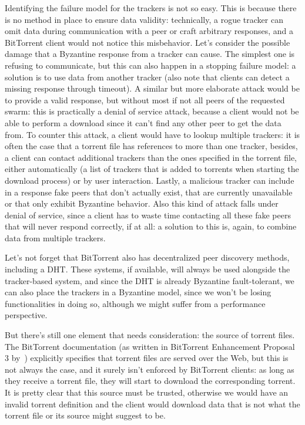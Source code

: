 \documentclass[mscthesis]{usiinfthesis}
\begin{document}
Identifying the failure model for the trackers is not so easy. This is because there is no method in place to ensure data validity: technically, a rogue tracker can omit data during communication with a peer or craft arbitrary responses, and a BitTorrent client would not notice this misbehavior. Let's consider the possible damage that a Byzantine response from a tracker can cause. The simplest one is refusing to communicate, but this can also happen in a stopping failure model: a solution is to use data from another tracker (also note that clients can detect a missing response through timeout). A similar but more elaborate attack would be to provide a valid response, but without most if not all peers of the requested swarm: this is practically a denial of service attack, because a client would not be able to perform a download since it can't find any other peer to get the data from. To counter this attack, a client would have to lookup multiple trackers: it is often the case that a torrent file has references to more than one tracker, besides, a client can contact additional trackers than the ones specified in the torrent file, either automatically (a list of trackers that is added to torrents when starting the download process) or by user interaction. Lastly, a malicious tracker can include in a response fake peers that don't actually exist, that are currently unavailable or that only exhibit Byzantine behavior. Also this kind of attack falls under denial of service, since a client has to waste time contacting all these fake peers that will never respond correctly, if at all: a solution to this is, again, to combine data from multiple trackers.

Let's not forget that BitTorrent also has decentralized peer discovery methods, including a DHT. These systems, if available, will always be used alongside the tracker-based system, and since the DHT is already Byzantine fault-tolerant, we can also place the trackers in a Byzantine model, since we won't be losing functionalities in doing so, although we might suffer from a performance perspective.

But there's still one element that needs consideration: the source of torrent files. The BitTorrent documentation (as written in BitTorrent Enhancement Proposal 3 by~\cite{bep:3}) explicitly specifies that torrent files are served over the Web, but this is not always the case, and it surely isn't enforced by BitTorrent clients: as long as they receive a torrent file, they will start to download the corresponding torrent. It is pretty clear that this source must be trusted, otherwise we would have an invalid torrent definition and the client would download data that is not what the torrent file or its source might suggest to be.
\end{document}
